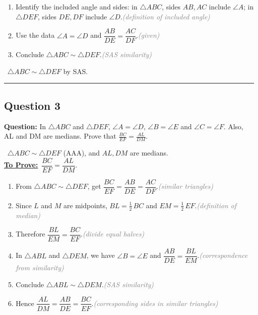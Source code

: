 \documentclass{article}
\newenvironment{steps}{%
  \begin{enumerate}[label=\textcolor{primary}{Step~\arabic*:}, leftmargin=*]
}{\end{enumerate}}
\newcommand{\sul}[1]{\uline{#1}}
\newcommand{\dul}[1]{\uuline{#1}}
\newcommand{\solutionheading}{{\raggedright\dul{\textbf{Solution}}\par}}
\newcommand{\given}[1]{\noindent\textbf{\textcolor{secondary}{\dul{Given:}}}~#1\\}
\newcommand{\toprove}[1]{\noindent\textbf{\textcolor{primary}{\sul{To Prove:}}}~#1\\}
\newcommand{\reason}[1]{\hfill\textit{\textcolor{gray}{(#1)}}}
\newcommand{\solutionrule}{\par\noindent\color{accent}\rule{\linewidth}{0.6pt}\par\smallskip}
\newcommand{\finalanswer}[1]{\noindent\textbf{\textcolor{accent}{\dul{Answer:}}}~#1\solutionrule}
\begin{document}
\begin{steps}
  \item Identify the included angle and sides: in $\triangle ABC$, sides $AB,AC$ include $\angle A$; in $\triangle DEF$, sides $DE,DF$ include $\angle D$.\reason{definition of included angle}
  \item Use the data $\angle A=\angle D$ and $\dfrac{AB}{DE}=\dfrac{AC}{DF}$.\reason{given}
  \item Conclude $\triangle ABC\sim\triangle DEF$.\reason{SAS similarity}
\end{steps}

\finalanswer{$\triangle ABC \sim \triangle DEF$ by SAS.}

\subsection*{Question 3}
\textbf{Question:} In $\triangle ABC$ and $\triangle DEF$, $\angle A = \angle D$, $\angle B = \angle E$ and $\angle C = \angle F$. Also, AL and DM are medians. Prove that $\frac{BC}{EF} = \frac{AL}{DM}$.

\solutionheading
\given{$\triangle ABC \sim \triangle DEF$ (AAA), and $AL, DM$ are medians.}
\toprove{$\dfrac{BC}{EF} = \dfrac{AL}{DM}$.}

\begin{center}
\end{center}

\begin{steps}
  \item From $\triangle ABC \sim \triangle DEF$, get $\dfrac{BC}{EF}=\dfrac{AB}{DE}=\dfrac{AC}{DF}$.\reason{similar triangles}
  \item Since $L$ and $M$ are midpoints, $BL=\tfrac12\,BC$ and $EM=\tfrac12\,EF$.\reason{definition of median}
  \item Therefore $\dfrac{BL}{EM}=\dfrac{BC}{EF}$.\reason{divide equal halves}
  \item In $\triangle ABL$ and $\triangle DEM$, we have $\angle B=\angle E$ and $\dfrac{AB}{DE}=\dfrac{BL}{EM}$.\reason{correspondence from similarity}
  \item Conclude $\triangle ABL\sim\triangle DEM$.\reason{SAS similarity}
  \item Hence $\dfrac{AL}{DM}=\dfrac{AB}{DE}=\dfrac{BC}{EF}$.\reason{corresponding sides in similar triangles}
\end{steps}
\end{document}
